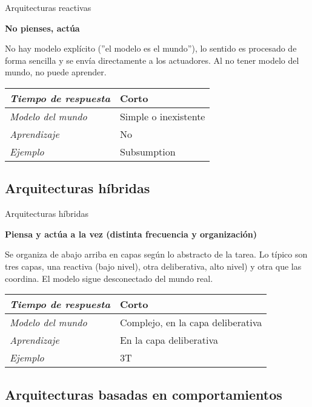 \documentclass{beamer}
\begin{document}
\begin{frame}{Arquitecturas reactivas}

\textbf{No pienses, actúa}

No hay modelo explícito (''el modelo es el mundo''), lo sentido es procesado de forma sencilla y se envía directamente a los actuadores. Al no tener modelo del mundo, no puede aprender.

\begin{tabular}{ l | l }
\emph{Tiempo de respuesta} & Corto \\ \hline
\emph{Modelo del mundo} & Simple o inexistente \\ \hline
\emph{Aprendizaje} & No \\ \hline
\emph{Ejemplo} & Subsumption
\end{tabular}

\end{frame}

\subsection{Arquitecturas híbridas}

\begin{frame}{Arquitecturas híbridas}

\textbf{Piensa y actúa a la vez (distinta frecuencia y organización)}

Se organiza de abajo arriba en capas según lo abstracto de la tarea. Lo típico son tres capas, una reactiva (bajo nivel), otra deliberativa, alto nivel) y otra que las coordina. El modelo sigue desconectado del mundo real.

\begin{tabular}{ l | l }
\emph{Tiempo de respuesta} & Corto \\ \hline
\emph{Modelo del mundo} & Complejo, en la capa deliberativa \\ \hline
\emph{Aprendizaje} & En la capa deliberativa \\ \hline
\emph{Ejemplo} & 3T
\end{tabular}

\end{frame}

\subsection{Arquitecturas basadas en comportamientos}
\end{document}
